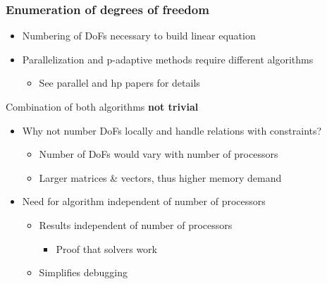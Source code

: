 \begin{frame}
\frametitle{Enumeration of degrees of freedom}

\begin{itemize}
\item Numbering of DoFs necessary to build linear equation
\item Parallelization and p-adaptive methods require different algorithms
  \begin{itemize}
  \item See parallel \parencite{bangerth2012} and hp \cite{bangerth2009} papers for details
  \end{itemize}
\end{itemize}

\vspace{-.7em}
\begin{block}{\vspace{-.7em}}
\centering
Combination of both algorithms \textbf{not trivial}
\end{block}

\vfill{}

\begin{itemize}
\item Why not number DoFs locally and handle relations with constraints?
  \begin{itemize}
  \item Number of DoFs would vary with number of processors
  \item Larger matrices \& vectors, thus higher memory demand
  \end{itemize}
\end{itemize}

\vfill{}

\begin{itemize}
  \item Need for algorithm independent of number of processors
  \begin{itemize}
    \item Results independent of number of processors
    \begin{itemize}
      \item Proof that solvers work
    \end{itemize}
    \item Simplifies debugging
  \end{itemize}
\end{itemize}
\end{frame}





